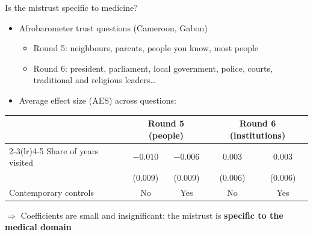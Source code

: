 \documentclass[aspectratio=1610]{beamer}
\newcommand{\highlight}[1]{\textcolor{accent}{\textbf{#1}}}
\begin{document}
\begin{frame}{Is the mistrust specific to medicine?}
  \begin{itemize}
    \item Afrobarometer trust questions (Cameroon, Gabon)
      \begin{itemize}
        \item Round 5: neighbours, parents, people you know, most people
        \item Round 6: president, parliament, local government, police, courts, traditional and religious leaders\dots
      \end{itemize}
    \item Average effect size (AES) across questions:
  \end{itemize}
  \centering
  \small
  \begin{tabular}{lcccc}
    \toprule
    & \multicolumn{2}{c}{Round 5 (people)} & \multicolumn{2}{c}{Round 6 (institutions)} \\
    \cmidrule(lr){2-3}\cmidrule(lr){4-5}
    Share of years visited & $-0.010$ & $-0.006$ & $0.003$ & $0.003$ \\
                           & (0.009)  & (0.009)  & (0.006) & (0.006) \\
    Contemporary controls  & No & Yes & No & Yes \\
    \bottomrule
  \end{tabular}

  \vspace{0.6em}
  \raggedright
  $\Rightarrow$ Coefficients are small and insignificant: the mistrust is \highlight{specific to the medical domain}
\end{frame}
\end{document}
